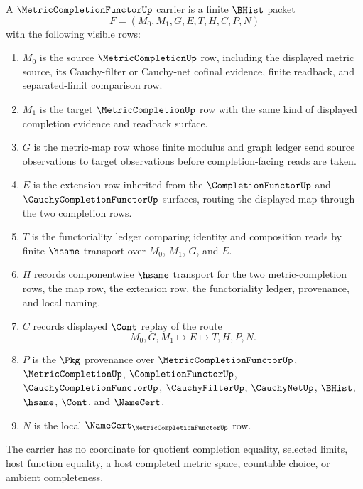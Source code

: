 \begin{definition}
\label{def:metric-completion-functor-carrier}
A $\MetricCompletionFunctorUp$ carrier is a finite $\BHist$ packet
$$
F=(M_0,M_1,G,E,T,H,C,P,N)
$$
with the following visible rows:
\begin{enumerate}
\item $M_0$ is the source $\MetricCompletionUp$ row, including the displayed metric source, its Cauchy-filter or Cauchy-net cofinal evidence, finite readback, and separated-limit comparison row.
\item $M_1$ is the target $\MetricCompletionUp$ row with the same kind of displayed completion evidence and readback surface.
\item $G$ is the metric-map row whose finite modulus and graph ledger send source observations to target observations before completion-facing reads are taken.
\item $E$ is the extension row inherited from the $\CompletionFunctorUp$ and $\CauchyCompletionFunctorUp$ surfaces, routing the displayed map through the two completion rows.
\item $T$ is the functoriality ledger comparing identity and composition reads by finite $\hsame$ transport over $M_0$, $M_1$, $G$, and $E$.
\item $H$ records componentwise $\hsame$ transport for the two metric-completion rows, the map row, the extension row, the functoriality ledger, provenance, and local naming.
\item $C$ records displayed $\Cont$ replay of the route
$$
M_0,G,M_1 \longmapsto E \longmapsto T,H,P,N .
$$
\item $P$ is the $\Pkg$ provenance over $\MetricCompletionFunctorUp$, $\MetricCompletionUp$, $\CompletionFunctorUp$, $\CauchyCompletionFunctorUp$, $\CauchyFilterUp$, $\CauchyNetUp$, $\BHist$, $\hsame$, $\Cont$, and $\NameCert$.
\item $N$ is the local $\NameCert_{\MetricCompletionFunctorUp}$ row.
\end{enumerate}
The carrier has no coordinate for quotient completion equality, selected limits, host function equality, a host completed metric space, countable choice, or ambient completeness.
\end{definition}

